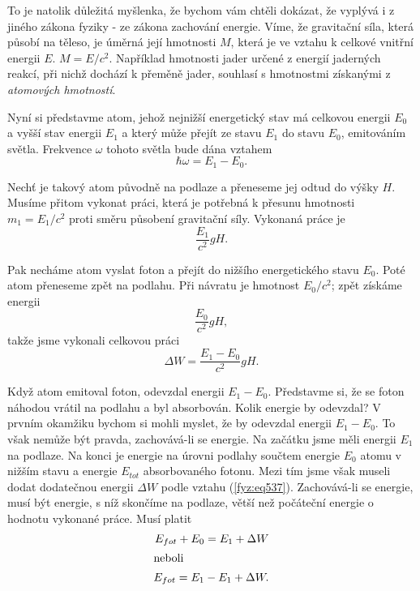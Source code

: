     To je natolik důležitá myšlenka, že bychom vám chtěli dokázat, že vyplývá i z jiného zákona 
    fyziky - ze zákona zachování energie. Víme, že gravitační síla, která působí na těleso, je 
    úměrná její hmotnosti \(M\), která je ve vztahu k celkové vnitřní energii \(E\). \(M=E/c^2\). 
    Například hmotnosti jader určené z energií jaderných reakcí, při nichž dochází k přeměně jader, 
    souhlasí s hmotnostmi získanými z \emph{atomových hmotností}.
    
    Nyní si představme atom, jehož nejnižší energetický stav má celkovou energii \(E_0\) a vyšší 
    stav energii \(E_1\) a který může přejít ze stavu \(E_1\) do stavu \(E_0\), emitováním světla. 
    Frekvence \(\omega\) tohoto světla bude dána vztahem
    \begin{equation}\label{fyz:eq534}
      \hbar\omega = E_1 - E_0.
    \end{equation}
    
    Nechť je takový atom původně na podlaze a přeneseme jej odtud do výšky \(H\). Musíme přitom 
    vykonat práci, která je potřebná k přesunu hmotnosti \(m_1 = E_1/c^2\) proti směru působení 
    gravitační síly. Vykonaná práce je
    \begin{equation}\label{fyz:eq535}
      \dfrac{E_1}{c^2}gH.
    \end{equation}
    
    Pak necháme atom vyslat foton a přejít do nižšího energetického stavu \(E_0\). Poté atom 
    přeneseme zpět na podlahu. Při návratu je hmotnost \(E_0/c^2\); zpět získáme energii
    \begin{equation}\label{fyz:eq536}
      \dfrac{E_0}{c^2}gH,
    \end{equation}
    takže jsme vykonali celkovou práci
    \begin{equation}\label{fyz:eq537}
      \Delta W = \dfrac{E_1 - E_0}{c^2}gH.
    \end{equation}
    
    Když atom emitoval foton, odevzdal energii \(E_1 - E_0\). Představme si, že se foton náhodou 
    vrátil na podlahu a byl absorbován. Kolik energie by odevzdal? V prvním okamžiku bychom si 
    mohli myslet, že by odevzdal energii \(E_1 - E_0\). To však nemůže být pravda, zachovává-li se 
    energie. Na začátku jsme měli energii \(E_1\) na podlaze. Na konci je energie na úrovni podlahy 
    součtem energie \(E_0\) atomu v nižším stavu a energie \(E_{tot}\) absorbovaného fotonu. Mezi 
    tím jsme však museli dodat dodatečnou energii \(\Delta W\) podle vztahu (\ref{fyz:eq537}). 
    Zachovává-li se energie, musí být energie, s níž skončíme na podlaze, větší než počáteční 
    energie o hodnotu vykonané práce. Musí platit
    \begin{subequations}
      \begin{align}
        E_{fot} + E_0 = E_1 + \Delta W       \label{fyz:eq538a}  \\
        \shortintertext{neboli}
        E_{fot} = E_1 - E_1 + \Delta W.      \label{fyz:eq538b}
      \end{align}
    \end{subequations}

